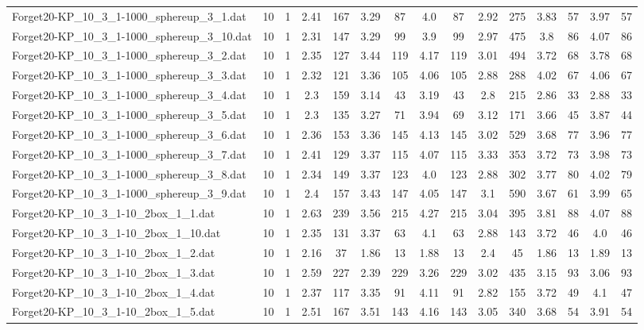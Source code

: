 \begin{table}[!ht]
{\begin{tabular}{lcccccccccccccc}
Forget20-KP\_10\_3\_1-1000\_sphereup\_3\_1.dat & 10 & 1 & 2.41 & 167 & 3.29 & 87 & 4.0 & 87 & 2.92 & 275 & 3.83 & 57 & 3.97 & 57 \\
Forget20-KP\_10\_3\_1-1000\_sphereup\_3\_10.dat & 10 & 1 & 2.31 & 147 & 3.29 & 99 & 3.9 & 99 & 2.97 & 475 & 3.8 & 86 & 4.07 & 86 \\
Forget20-KP\_10\_3\_1-1000\_sphereup\_3\_2.dat & 10 & 1 & 2.35 & 127 & 3.44 & 119 & 4.17 & 119 & 3.01 & 494 & 3.72 & 68 & 3.78 & 68 \\
Forget20-KP\_10\_3\_1-1000\_sphereup\_3\_3.dat & 10 & 1 & 2.32 & 121 & 3.36 & 105 & 4.06 & 105 & 2.88 & 288 & 4.02 & 67 & 4.06 & 67 \\
Forget20-KP\_10\_3\_1-1000\_sphereup\_3\_4.dat & 10 & 1 & 2.3 & 159 & 3.14 & 43 & 3.19 & 43 & 2.8 & 215 & 2.86 & 33 & 2.88 & 33 \\
Forget20-KP\_10\_3\_1-1000\_sphereup\_3\_5.dat & 10 & 1 & 2.3 & 135 & 3.27 & 71 & 3.94 & 69 & 3.12 & 171 & 3.66 & 45 & 3.87 & 44 \\
Forget20-KP\_10\_3\_1-1000\_sphereup\_3\_6.dat & 10 & 1 & 2.36 & 153 & 3.36 & 145 & 4.13 & 145 & 3.02 & 529 & 3.68 & 77 & 3.96 & 77 \\
Forget20-KP\_10\_3\_1-1000\_sphereup\_3\_7.dat & 10 & 1 & 2.41 & 129 & 3.37 & 115 & 4.07 & 115 & 3.33 & 353 & 3.72 & 73 & 3.98 & 73 \\
Forget20-KP\_10\_3\_1-1000\_sphereup\_3\_8.dat & 10 & 1 & 2.34 & 149 & 3.37 & 123 & 4.0 & 123 & 2.88 & 302 & 3.77 & 80 & 4.02 & 79 \\
Forget20-KP\_10\_3\_1-1000\_sphereup\_3\_9.dat & 10 & 1 & 2.4 & 157 & 3.43 & 147 & 4.05 & 147 & 3.1 & 590 & 3.67 & 61 & 3.99 & 65 \\
Forget20-KP\_10\_3\_1-10\_2box\_1\_1.dat & 10 & 1 & 2.63 & 239 & 3.56 & 215 & 4.27 & 215 & 3.04 & 395 & 3.81 & 88 & 4.07 & 88 \\
Forget20-KP\_10\_3\_1-10\_2box\_1\_10.dat & 10 & 1 & 2.35 & 131 & 3.37 & 63 & 4.1 & 63 & 2.88 & 143 & 3.72 & 46 & 4.0 & 46 \\
Forget20-KP\_10\_3\_1-10\_2box\_1\_2.dat & 10 & 1 & 2.16 & 37 & 1.86 & 13 & 1.88 & 13 & 2.4 & 45 & 1.86 & 13 & 1.89 & 13 \\
Forget20-KP\_10\_3\_1-10\_2box\_1\_3.dat & 10 & 1 & 2.59 & 227 & 2.39 & 229 & 3.26 & 229 & 3.02 & 435 & 3.15 & 93 & 3.06 & 93 \\
Forget20-KP\_10\_3\_1-10\_2box\_1\_4.dat & 10 & 1 & 2.37 & 117 & 3.35 & 91 & 4.11 & 91 & 2.82 & 155 & 3.72 & 49 & 4.1 & 47 \\
Forget20-KP\_10\_3\_1-10\_2box\_1\_5.dat & 10 & 1 & 2.51 & 167 & 3.51 & 143 & 4.16 & 143 & 3.05 & 340 & 3.68 & 54 & 3.91 & 54 \\

\end{tabular}}
\end{table}
